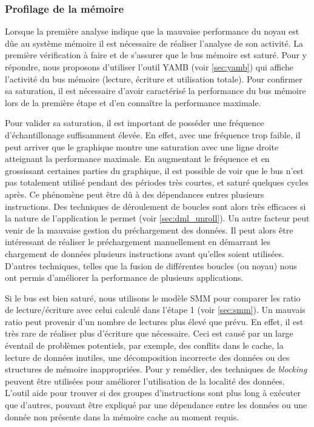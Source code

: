         
        \subsubsection{Profilage de la mémoire}
            Lorsque la première analyse indique que la mauvaise performance du noyau est dûe au système mémoire il est nécessaire de réaliser l'analyse de son activité. La première vérification à faire et de s'assurer que le bus mémoire est saturé. Pour y répondre, nous proposons d'utiliser l'outil YAMB (voir \autoref{sec:yamb}) qui affiche l'activité du bus mémoire (lecture, écriture et utilisation totale). Pour confirmer sa saturation, il est nécessaire d'avoir caractérisé la performance du bus mémoire lors de la première étape et d'en connaître la performance maximale. 
            
            Pour valider sa saturation, il est important de posséder une fréquence d'échantillonage suffisamment élevée. En effet, avec une fréquence trop faible, il peut arriver que le graphique montre une saturation avec une ligne droite atteignant la performance maximale. En augmentant le fréquence et en grossissant certaines parties du graphique, il est possible de voir que le bus n'est pas totalement utilisé pendant des périodes très courtes, et saturé quelques cycles après. Ce phénomène peut être dû à des dépendances entres plusieurs instructions. Des techniques de déroulement de boucles sont alors très efficaces si la nature de l'application le permet (voir \autoref{sec:dml_unroll}). Un autre facteur peut venir de la mauvaise gestion du préchargement des données. Il peut alors être intéressant de réaliser le préchargement manuellement en démarrant les chargement de données plusieurs instructions avant qu'elles soient utilisées. D'autres techniques, telles que la fusion de différentes boucles (ou noyau) nous ont permis d'améliorer la performance de plusieurs applications.
            
            Si le bus est bien saturé, nous utilisons le modèle SMM pour comparer les ratio de lecture/écriture avec celui calculé dans l'étape 1 (voir \autoref{sec:smm}). Un mauvais ratio peut provenir d'un nombre de lectures plus élevé que prévu. En effet, il est très rare de réaliser plus d'écriture que nécessaire. Ceci est causé par un large éventail de problèmes potentiels, par exemple, des conflits dans le cache, la lecture de données inutiles, une décomposition incorrecte des données ou des structures de mémoire inappropriées. Pour y remédier, des techniques de \textit{blocking} peuvent être utilisées pour améliorer l'utilisation de la localité des données.  L'outil aide pour trouver si des groupes d'instructions sont plus long à exécuter que d'autres, pouvant être expliqué par une dépendance entre les données ou une donnée non présente dans la mémoire cache au moment requis. 
        
